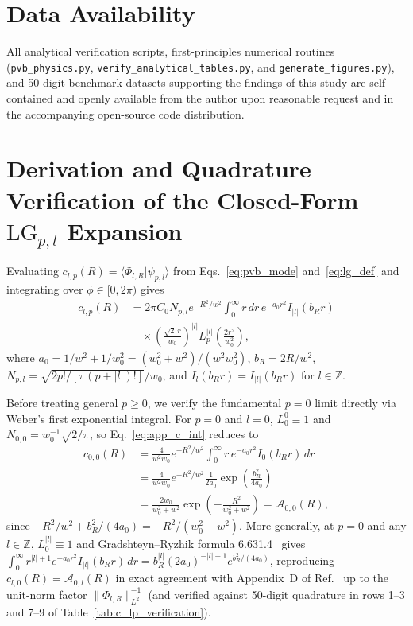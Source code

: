 \documentclass[aps,pra,onecolumn,notitlepage,11pt,tightenlines,nofootinbib,floatfix,longbibliography]{revtex4-2}
\theoremstyle{remark}
\newcommand{\braket}[2]{\langle #1 | #2 \rangle}
\newcommand{\norm}[1]{\lVert #1 \rVert}
\newcommand{\abs}[1]{\lvert #1 \rvert}
\begin{document}
\section*{Data Availability}
All analytical verification scripts, first-principles numerical routines (\texttt{pvb\_\allowbreak physics.py}, \texttt{verify\_\allowbreak analytical\_\allowbreak tables.py}, and \texttt{generate\_\allowbreak figures.py}), and 50-digit benchmark datasets supporting the findings of this study are self-contained and openly available from the author upon reasonable request and in the accompanying open-source code distribution.

\appendix

\section{Derivation and Quadrature Verification of the Closed-Form \texorpdfstring{$\mathrm{LG}_{p,l}$}{LG\_\{p,l\}} Expansion}
\label{app:lg_expansion}

Evaluating $c_{l,p}(R) = \braket{\Phi_{l,R}}{\psi_{p,l}}$ from Eqs.~\eqref{eq:pvb_mode} and~\eqref{eq:lg_def} and integrating over $\phi \in [0,2\pi)$ gives
\begin{align}
c_{l,p}(R) &= 2\pi C_0 N_{p,l} e^{-R^2/w^2} \int_0^\infty r\,dr\, e^{-a_0 r^2} I_{\abs{l}}(b_R r) \nonumber \\
&\quad \times \left(\frac{\sqrt{2}\,r}{w_0}\right)^{\abs{l}} L_p^{\abs{l}}\!\left(\frac{2r^2}{w_0^2}\right),
\label{eq:app_c_int}
\end{align}
where $a_0 = 1/w^2 + 1/w_0^2 = (w_0^2+w^2)/(w^2 w_0^2)$, $b_R = 2R/w^2$, $N_{p,l} = \sqrt{2p!/[\pi(p+\abs{l})!]}/w_0$, and $I_l(b_R r) = I_{\abs{l}}(b_R r)$ for $l \in \mathbb{Z}$.

Before treating general $p \ge 0$, we verify the fundamental $p = 0$ limit directly via Weber's first exponential integral. For $p = 0$ and $l = 0$, $L_0^0 \equiv 1$ and $N_{0,0} = w_0^{-1}\sqrt{2/\pi}$, so Eq.~\eqref{eq:app_c_int} reduces to
\begin{align}
c_{0,0}(R) &= \frac{4}{w^2 w_0} e^{-R^2/w^2} \int_0^\infty r\,e^{-a_0 r^2} I_0(b_R r)\,dr \nonumber \\
&= \frac{4}{w^2 w_0} e^{-R^2/w^2} \frac{1}{2a_0} \exp\!\left(\frac{b_R^2}{4a_0}\right) \nonumber \\
&= \frac{2w_0}{w_0^2 + w^2} \exp\!\left(-\frac{R^2}{w_0^2 + w^2}\right) = \mathcal{A}_{0,0}(R),
\label{eq:app_p0_l0_check}
\end{align}
since $-R^2/w^2 + b_R^2/(4a_0) = -R^2/(w_0^2 + w^2)$. More generally, at $p = 0$ and any $l \in \mathbb{Z}$, $L_0^{\abs{l}} \equiv 1$ and Gradshteyn--Ryzhik formula 6.631.4~\cite{Gradshteyn2014} gives $\int_0^\infty r^{\abs{l}+1} e^{-a_0 r^2} I_{\abs{l}}(b_R r)\,dr = b_R^{\abs{l}} (2 a_0)^{-\abs{l}-1} e^{b_R^2/(4a_0)}$, reproducing $c_{l,0}(R) = \mathcal{A}_{0,l}(R)$ in exact agreement with Appendix~D of Ref.~\cite{Ferreira2026} up to the unit-norm factor $\norm{\Phi_{l,R}}_{L^2}^{-1}$ (and verified against 50-digit quadrature in rows 1--3 and 7--9 of Table~\ref{tab:c_lp_verification}).
\end{document}

